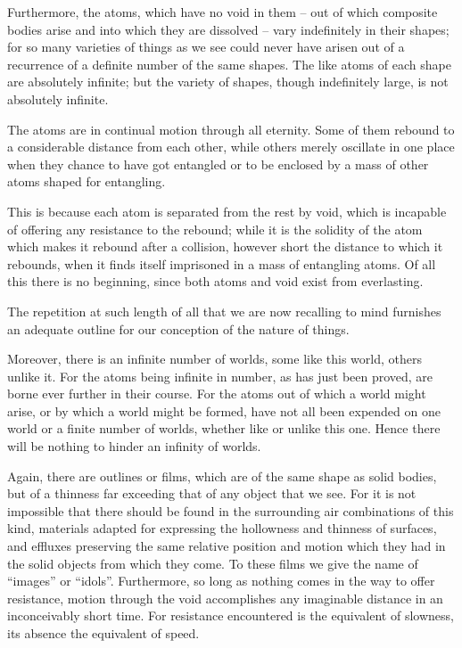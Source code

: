 \documentclass{stex}
\begin{document}
Furthermore, the atoms, which have no void in them – out of which composite bodies arise and into which they are dissolved – vary indefinitely in their shapes; for so many varieties of things as we see could never have arisen out of a recurrence of a definite number of the same shapes.
The like atoms of each shape are absolutely infinite; but the variety of shapes, though indefinitely large, is not absolutely infinite.

The atoms are in continual motion through all eternity.
Some of them rebound to a considerable distance from each other, while others merely oscillate in one place when they chance to have got entangled or to be enclosed by a mass of other atoms shaped for entangling.

This is because each atom is separated from the rest by void, which is incapable of offering any resistance to the rebound; while it is the solidity of the atom which makes it rebound after a collision, however short the distance to which it rebounds, when it finds itself imprisoned in a mass of entangling atoms.
Of all this there is no beginning, since both atoms and void exist from everlasting.

The repetition at such length of all that we are now recalling to mind furnishes an adequate outline for our conception of the nature of things.

Moreover, there is an infinite number of worlds, some like this world, others unlike it.
For the atoms being infinite in number, as has just been proved, are borne ever further in their course.
For the atoms out of which a world might arise, or by which a world might be formed, have not all been expended on one world or a finite number of worlds, whether like or unlike this one.
Hence there will be nothing to hinder an infinity of worlds.

Again, there are outlines or films, which are of the same shape as solid bodies, but of a thinness far exceeding that of any object that we see.
For it is not impossible that there should be found in the surrounding air combinations of this kind, materials adapted for expressing the hollowness and thinness of surfaces, and effluxes preserving the same relative position and motion which they had in the solid objects from which they come.
To these films we give the name of \enquote{images} or \enquote{idols}.
Furthermore, so long as nothing comes in the way to offer resistance, motion through the void accomplishes any imaginable distance in an inconceivably short time.
For resistance encountered is the equivalent of slowness, its absence the equivalent of speed.
\end{document}
